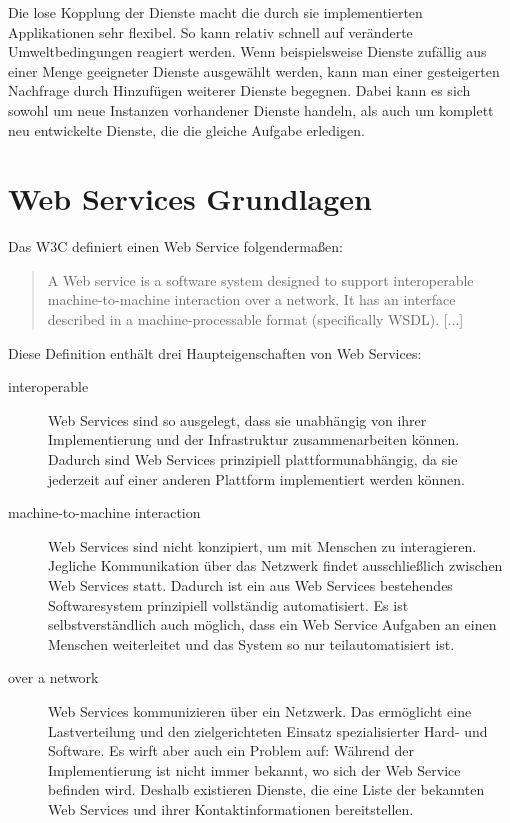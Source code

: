 \documentclass[runningheads]{llncs}
\newcommand{\germanquote}[1]{\glqq{}#1\grqq{}}
\begin{document}
    Die lose Kopplung der Dienste macht die durch sie implementierten Applikationen sehr flexibel.
    So kann relativ schnell auf veränderte Umweltbedingungen reagiert werden. Wenn beispielsweise
    Dienste zufällig aus einer Menge geeigneter Dienste ausgewählt werden, kann man einer
    gesteigerten Nachfrage durch Hinzufügen weiterer Dienste begegnen. Dabei kann es sich sowohl um
    neue Instanzen vorhandener Dienste handeln, als auch um komplett neu entwickelte Dienste, die
    die gleiche Aufgabe erledigen.


  \label{ws}
  \section{Web Services Grundlagen}
  \nocite{wk_ws}
    Das W3C definiert einen \germanquote{Web Service} folgendermaßen:
    \begin{quote}
      A Web service is a software system designed to support interoperable machine-to-machine interaction
      over a network. It has an interface described in a machine-processable format (specifically
      WSDL). [...]\cite{w3c_wsgloss_ws}
    \end{quote}

    Diese Definition enthält drei Haupteigenschaften von Web Services:
    \begin{description}
      \item[interoperable]
        Web Services sind so ausgelegt, dass sie unabhängig von ihrer Implementierung und der
        Infrastruktur zusammenarbeiten können. Dadurch sind Web Services prinzipiell
        plattformunabhängig, da sie jederzeit auf einer anderen Plattform implementiert werden
        können.
      \item[machine-to-machine interaction]
        Web Services sind nicht konzipiert, um mit Menschen zu interagieren. Jegliche Kommunikation
        über das Netzwerk findet ausschließlich zwischen Web Services statt. Dadurch ist ein aus
        Web Services bestehendes Softwaresystem prinzipiell vollständig automatisiert. Es ist
        selbstverständlich auch möglich, dass ein Web Service Aufgaben an einen Menschen
        weiterleitet und das System so nur teilautomatisiert ist.
      \item[over a network]
        Web Services kommunizieren über ein Netzwerk. Das ermöglicht eine Lastverteilung und den
        zielgerichteten Einsatz spezialisierter Hard- und Software. Es wirft aber auch ein Problem
        auf: Während der Implementierung ist nicht immer bekannt, wo sich der Web Service befinden
        wird. Deshalb existieren Dienste, die eine Liste der bekannten Web Services und ihrer
        Kontaktinformationen bereitstellen.
    \end{description}
\end{document}
